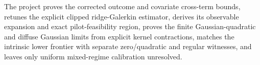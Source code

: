 The project proves the corrected outcome and covariate cross-term bounds, retunes the explicit clipped ridge-Galerkin estimator, derives its observable expansion and exact pilot-feasibility region, proves the finite Gaussian-quadratic and diffuse Gaussian limits from explicit kernel contractions, matches the intrinsic lower frontier with separate zero/quadratic and regular witnesses, and leaves only uniform mixed-regime calibration unresolved.
